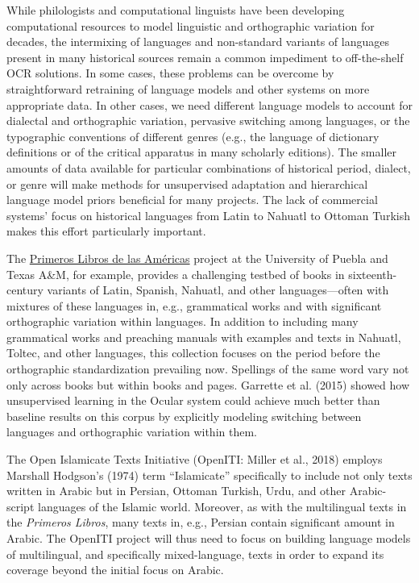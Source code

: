 \documentclass[twoside,11pt]{report}
\begin{document}
While philologists and computational linguists have been developing computational resources to model linguistic and orthographic variation for decades, the intermixing of languages and non-standard variants of languages present in many historical sources remain a common impediment to off-the-shelf OCR solutions. In some cases, these problems can be overcome by straightforward retraining of language models and other systems on more appropriate data. In other cases, we need different language models to account for dialectal and orthographic variation, pervasive switching among languages, or the typographic conventions of different genres (e.g., the language of dictionary definitions or of the critical apparatus in many scholarly editions). The smaller amounts of data available for particular combinations of historical period, dialect, or genre will make methods for unsupervised adaptation and hierarchical language model priors beneficial for many projects. The lack of commercial systems' focus on historical languages from Latin to Nahuatl to Ottoman Turkish makes this effort particularly important.

The \href{http://primeroslibros.org/}{Primeros Libros de las Américas} project at the University of Puebla and Texas A\&M, for example, provides a challenging testbed of books in sixteenth-century variants of Latin, Spanish, Nahuatl, and other languages---often with mixtures of these languages in, e.g., grammatical works and with significant orthographic variation within languages. In addition to including many grammatical works and preaching manuals with examples and texts in Nahuatl, Toltec, and other languages, this collection focuses on the period before the orthographic standardization prevailing now. Spellings of the same word vary not only across books but within books and pages. Garrette et al. (2015) showed how unsupervised learning in the Ocular system could achieve much better than baseline results on this corpus by explicitly modeling switching between languages and orthographic variation within them.

The Open Islamicate Texts Initiative (OpenITI: Miller et al., 2018) employs Marshall Hodgson's (1974) term ``Islamicate'' specifically to include not only texts written in Arabic but in Persian, Ottoman Turkish, Urdu, and other Arabic-script languages of the Islamic world. Moreover, as with the multilingual texts in the \emph{Primeros Libros}, many texts in, e.g., Persian contain significant amount in Arabic. The OpenITI project will thus need to focus on building language models of multilingual, and specifically mixed-language, texts in order to expand its coverage beyond the initial focus on Arabic.
\end{document}
